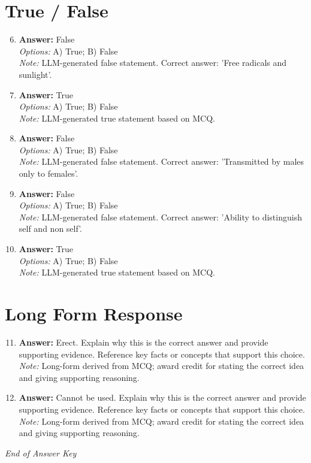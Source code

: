 \documentclass[12pt]{article}
\begin{document}
\section*{True / False}
\begin{enumerate}[label=\arabic*.]
\setcounter{enumi}{5}
\item \textbf{Answer:} False
\\ \textit{Options:} A) True; B) False
\\ \textit{Note:} LLM-generated false statement. Correct answer: 'Free radicals and sunlight'.
\item \textbf{Answer:} True
\\ \textit{Options:} A) True; B) False
\\ \textit{Note:} LLM-generated true statement based on MCQ.
\item \textbf{Answer:} False
\\ \textit{Options:} A) True; B) False
\\ \textit{Note:} LLM-generated false statement. Correct answer: 'Transmitted by males only to females'.
\item \textbf{Answer:} False
\\ \textit{Options:} A) True; B) False
\\ \textit{Note:} LLM-generated false statement. Correct answer: 'Ability to distinguish self and non self'.
\item \textbf{Answer:} True
\\ \textit{Options:} A) True; B) False
\\ \textit{Note:} LLM-generated true statement based on MCQ.
\end{enumerate}

\section*{Long Form Response}
\begin{enumerate}[label=\arabic*.]
\setcounter{enumi}{10}
\item \textbf{Answer:} Erect. Explain why this is the correct answer and provide supporting evidence. Reference key facts or concepts that support this choice.
\\ \textit{Note:} Long-form derived from MCQ; award credit for stating the correct idea and giving supporting reasoning.
\item \textbf{Answer:} Cannot be used. Explain why this is the correct answer and provide supporting evidence. Reference key facts or concepts that support this choice.
\\ \textit{Note:} Long-form derived from MCQ; award credit for stating the correct idea and giving supporting reasoning.
\end{enumerate}

\vfill
\noindent\textit{End of Answer Key}
\end{document}
